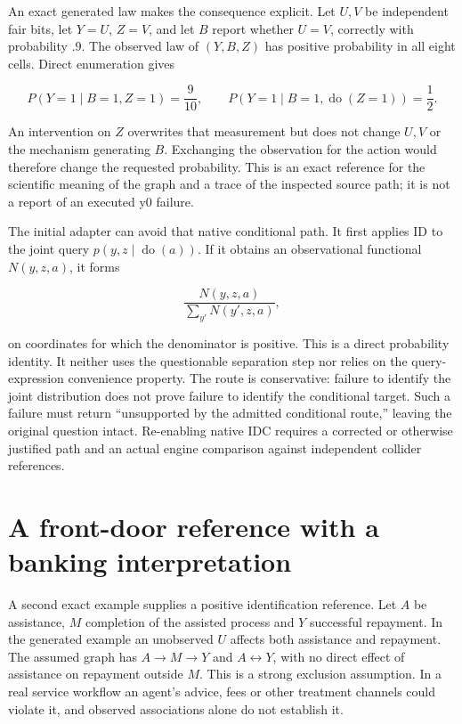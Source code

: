 An exact generated law makes the consequence explicit. Let \(U,V\) be
independent fair bits, let \(Y=U\), \(Z=V\), and let \(B\) report
whether \(U=V\), correctly with probability \(.9\). The observed law of
\((Y,B,Z)\) has positive probability in all eight cells. Direct
enumeration gives

\[
 P(Y=1\mid B=1,Z=1)=\frac9{10},
 \qquad
 P(Y=1\mid B=1,\operatorname{do}(Z=1))=\frac12.
\]

An intervention on \(Z\) overwrites that measurement but does not change
\(U,V\) or the mechanism generating \(B\). Exchanging the observation
for the action would therefore change the requested probability. This is
an exact reference for the scientific meaning of the graph and a trace
of the inspected source path; it is not a report of an executed y0
failure. \citep{exec13_y0_oracles}

The initial adapter can avoid that native conditional path. It first
applies ID to the joint query \(p(y,z\mid\operatorname{do}(a))\). If it
obtains an observational functional \(N(y,z,a)\), it forms

\[
 \frac{N(y,z,a)}{\sum_{y'}N(y',z,a)},
\]

on coordinates for which the denominator is positive. This is a direct
probability identity. It neither uses the questionable separation step
nor relies on the query-expression convenience property. The route is
conservative: failure to identify the joint distribution does not prove
failure to identify the conditional target. Such a failure must return
``unsupported by the admitted conditional route,'' leaving the original
question intact. Re-enabling native IDC requires a corrected or
otherwise justified path and an actual engine comparison against
independent collider references.

\hypertarget{a-front-door-reference-with-a-banking-interpretation}{%
\section{A front-door reference with a banking
interpretation}\label{a-front-door-reference-with-a-banking-interpretation}}

A second exact example supplies a positive identification reference. Let
\(A\) be assistance, \(M\) completion of the assisted process and \(Y\)
successful repayment. In the generated example an unobserved \(U\)
affects both assistance and repayment. The assumed graph has
\(A\to M\to Y\) and \(A\leftrightarrow Y\), with no direct effect of
assistance on repayment outside \(M\). This is a strong exclusion
assumption. In a real service workflow an agent's advice, fees or other
treatment channels could violate it, and observed associations alone do
not establish it.

